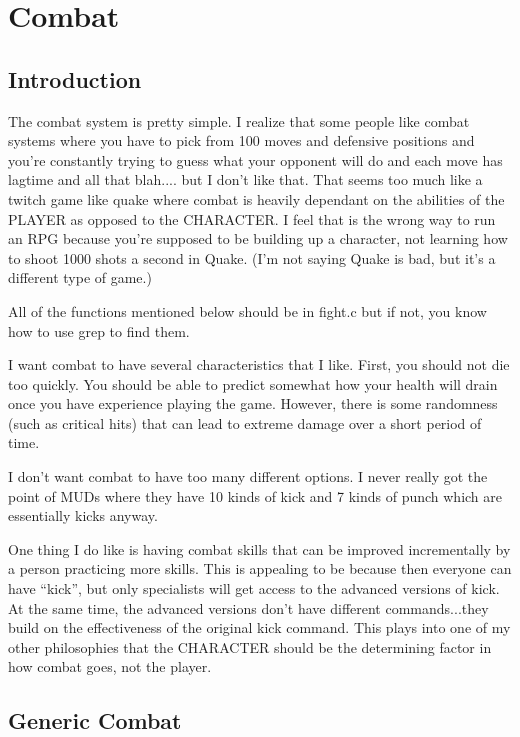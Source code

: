 \chapter{Combat}

\section{Introduction}

The combat system is pretty simple. I realize that some people like
combat systems where you have to pick from 100 moves and defensive
positions and you're constantly trying to guess what your opponent
will do and each move has lagtime and all that blah.... but I don't
like that. That seems too much like a twitch game like quake where
combat is heavily dependant on the abilities of the PLAYER as opposed
to the CHARACTER. I feel that is the wrong way to run an RPG because
you're supposed to be building up a character, not learning how to
shoot 1000 shots a second in Quake. (I'm not saying Quake is bad, but
it's a different type of game.) 

All of the functions mentioned below should be in fight.c but if not,
you know how to use grep to find them.

I want combat to have several characteristics that I like. First, you
should not die too quickly. You should be able to predict somewhat how
your health will drain once you have experience playing the
game. However, there is some randomness (such as critical hits) that
can lead to extreme damage over a short period of time.

I don't want combat to have too many different options. I never really
got the point of MUDs where they have 10 kinds of kick and 7 kinds of
punch which are essentially kicks anyway.

One thing I do like is having combat skills that can be improved
incrementally by a person practicing more skills. This is appealing to
be because then everyone can have ``kick'', but only specialists will
get access to the advanced versions of kick. At the same time, the
advanced versions don't have different commands...they build on the
effectiveness of the original kick command. This plays into one of my
other philosophies that the CHARACTER should be the determining factor
in how combat goes, not the player.

\section{Generic Combat}

